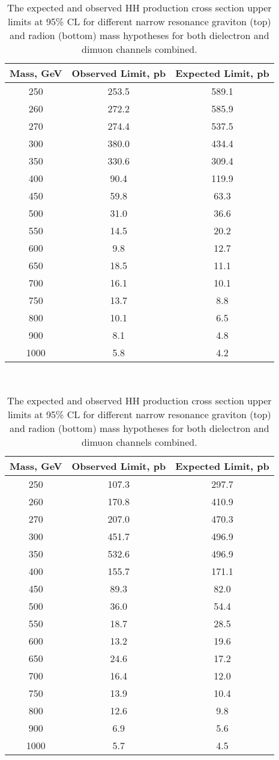\begin{table}[H]
\begin{center}
\caption{The expected and observed HH production cross section upper limits at 95\% CL for different
narrow resonance graviton (top) and radion (bottom) mass hypotheses for both dielectron and dimuon channels combined.}
\label{tab:finalLimits}
\begin{tabular}{|c|c|c|}
\hline
Mass, GeV & Observed Limit, pb & Expected Limit, pb \\
\hline
250 & 253.5 & 589.1 \\
260 & 272.2 & 585.9 \\
270 & 274.4 & 537.5 \\
300 & 380.0 & 434.4 \\
350 & 330.6 & 309.4 \\
400 & 90.4 & 119.9 \\
450 & 59.8 & 63.3 \\
500 & 31.0 & 36.6 \\
550 & 14.5 & 20.2 \\
600 & 9.8 & 12.7 \\
650 & 18.5 & 11.1 \\
700 & 16.1 & 10.1 \\
750 & 13.7 & 8.8 \\
800 & 10.1 & 6.5 \\
900 & 8.1 & 4.8 \\
1000 & 5.8 & 4.2 \\
\hline
\end{tabular}
\vspace{1 cm} \ \\
\begin{tabular}{|c|c|c|}
\hline
Mass, GeV & Observed Limit, pb & Expected Limit, pb \\
\hline
250 & 107.3 & 297.7 \\
260 & 170.8 & 410.9 \\
270 & 207.0 & 470.3 \\
300 & 451.7 & 496.9 \\
350 & 532.6 & 496.9 \\
400 & 155.7 & 171.1 \\
450 & 89.3 & 82.0 \\
500 & 36.0 & 54.4 \\
550 & 18.7 & 28.5 \\
600 & 13.2 & 19.6 \\
650 & 24.6 & 17.2 \\
700 & 16.4 & 12.0 \\
750 & 13.9 & 10.4 \\
800 & 12.6 & 9.8 \\
900 & 6.9 & 5.6 \\
1000 & 5.7 & 4.5 \\
\hline
\end{tabular}
\end{center}
\end{table}

